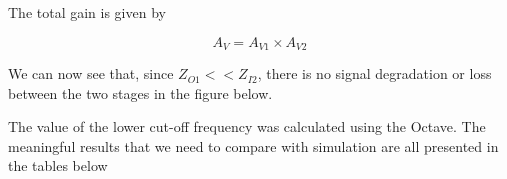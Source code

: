 The total gain is given by

\begin{equation}
A_V = A_{V1} \times A_{V2}
\label{eq:1.11}
\end{equation}

We can now see that, since $Z_{O1}<<Z_{I2}$, there is no signal degradation or loss between the two stages in the figure below.


The value of the lower cut-off frequency was calculated using the Octave. The meaningful results that we need to compare with simulation are all presented in the tables below




